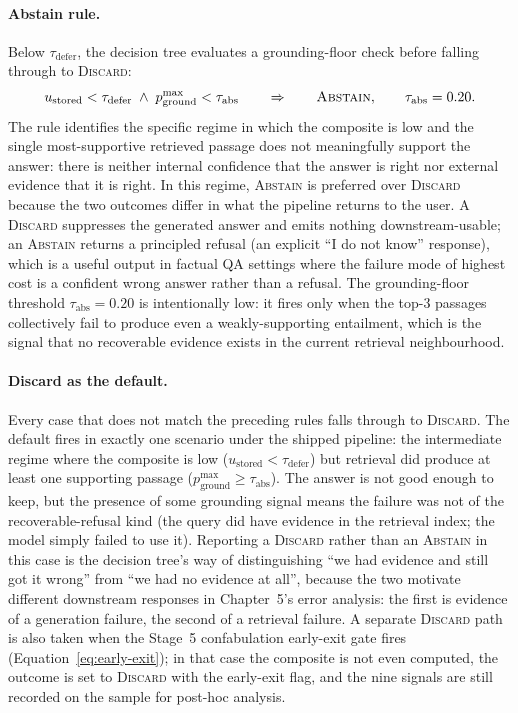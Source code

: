 \paragraph{Abstain rule.}
Below $\tau_{\text{defer}}$, the decision tree evaluates a grounding-floor check before falling through to \textsc{Discard}:
\begin{equation}
u_{\text{stored}} < \tau_{\text{defer}} \;\wedge\; p_{\text{ground}}^{\max} < \tau_{\text{abs}} \qquad \Rightarrow \qquad \textsc{Abstain}, \qquad \tau_{\text{abs}} = 0.20.
\label{eq:abstain}
\end{equation}
The rule identifies the specific regime in which the composite is low and the single most-supportive retrieved passage does not meaningfully support the answer: there is neither internal confidence that the answer is right nor external evidence that it is right. In this regime, \textsc{Abstain} is preferred over \textsc{Discard} because the two outcomes differ in what the pipeline returns to the user. A \textsc{Discard} suppresses the generated answer and emits nothing downstream-usable; an \textsc{Abstain} returns a principled refusal (an explicit ``I do not know'' response), which is a useful output in factual QA settings where the failure mode of highest cost is a confident wrong answer rather than a refusal. The grounding-floor threshold $\tau_{\text{abs}} = 0.20$ is intentionally low: it fires only when the top-3 passages collectively fail to produce even a weakly-supporting entailment, which is the signal that no recoverable evidence exists in the current retrieval neighbourhood.

\paragraph{Discard as the default.}
Every case that does not match the preceding rules falls through to \textsc{Discard}. The default fires in exactly one scenario under the shipped pipeline: the intermediate regime where the composite is low ($u_{\text{stored}} < \tau_{\text{defer}}$) but retrieval did produce at least one supporting passage ($p_{\text{ground}}^{\max} \geq \tau_{\text{abs}}$). The answer is not good enough to keep, but the presence of some grounding signal means the failure was not of the recoverable-refusal kind (the query did have evidence in the retrieval index; the model simply failed to use it). Reporting a \textsc{Discard} rather than an \textsc{Abstain} in this case is the decision tree's way of distinguishing ``we had evidence and still got it wrong'' from ``we had no evidence at all'', because the two motivate different downstream responses in Chapter~5's error analysis: the first is evidence of a generation failure, the second of a retrieval failure. A separate \textsc{Discard} path is also taken when the Stage~5 confabulation early-exit gate fires (Equation~\ref{eq:early-exit}); in that case the composite is not even computed, the outcome is set to \textsc{Discard} with the early-exit flag, and the nine signals are still recorded on the sample for post-hoc analysis.

